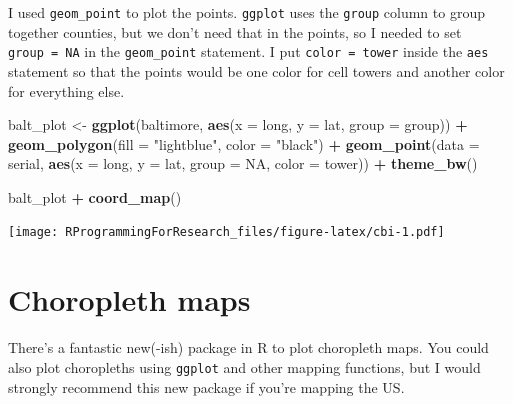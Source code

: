 \documentclass[]{book}
\makeatletter
\newenvironment{Shaded}{\begin{snugshade}}{\end{snugshade}}
\newcommand{\KeywordTok}[1]{\textcolor[rgb]{0.13,0.29,0.53}{\textbf{#1}}}
\newcommand{\DataTypeTok}[1]{\textcolor[rgb]{0.13,0.29,0.53}{#1}}
\newcommand{\StringTok}[1]{\textcolor[rgb]{0.31,0.60,0.02}{#1}}
\newcommand{\OtherTok}[1]{\textcolor[rgb]{0.56,0.35,0.01}{#1}}
\newcommand{\OperatorTok}[1]{\textcolor[rgb]{0.81,0.36,0.00}{\textbf{#1}}}
\newcommand{\NormalTok}[1]{#1}
\newenvironment{kframe}{%
\medskip{}
\setlength{\fboxsep}{.8em}
 \def\at@end@of@kframe{}%
 \ifinner\ifhmode%
  \def\at@end@of@kframe{\end{minipage}}%
  \begin{minipage}{\columnwidth}%
 \fi\fi%
 \def\FrameCommand##1{\hskip\@totalleftmargin \hskip-\fboxsep
 \colorbox{shadecolor}{##1}\hskip-\fboxsep
     \hskip-\linewidth \hskip-\@totalleftmargin \hskip\columnwidth}%
 \MakeFramed {\advance\hsize-\width
   \@totalleftmargin\z@ \linewidth\hsize
   \@setminipage}}%
 {\par\unskip\endMakeFramed%
 \at@end@of@kframe}
\renewenvironment{Shaded}{\begin{kframe}}{\end{kframe}}
\theoremstyle{definition}
\theoremstyle{definition}
\theoremstyle{definition}
\theoremstyle{remark}
\makeatother
\begin{document}
I used \texttt{geom\_point} to plot the points. \texttt{ggplot} uses the
\texttt{group} column to group together counties, but we don't need that
in the points, so I needed to set \texttt{group\ =\ NA} in the
\texttt{geom\_point} statement. I put \texttt{color\ =\ tower} inside
the \texttt{aes} statement so that the points would be one color for
cell towers and another color for everything else.

\begin{Shaded}
\begin{Highlighting}[]
\NormalTok{balt_plot <-}\StringTok{ }\KeywordTok{ggplot}\NormalTok{(baltimore, }
                    \KeywordTok{aes}\NormalTok{(}\DataTypeTok{x =}\NormalTok{ long, }\DataTypeTok{y =}\NormalTok{ lat, }\DataTypeTok{group =}\NormalTok{ group)) }\OperatorTok{+}\StringTok{ }
\StringTok{        }\KeywordTok{geom_polygon}\NormalTok{(}\DataTypeTok{fill =} \StringTok{"lightblue"}\NormalTok{, }\DataTypeTok{color =} \StringTok{"black"}\NormalTok{) }\OperatorTok{+}
\StringTok{        }\KeywordTok{geom_point}\NormalTok{(}\DataTypeTok{data =}\NormalTok{ serial, }\KeywordTok{aes}\NormalTok{(}\DataTypeTok{x =}\NormalTok{ long, }\DataTypeTok{y =}\NormalTok{ lat,}
                                      \DataTypeTok{group =} \OtherTok{NA}\NormalTok{,}
                                      \DataTypeTok{color =}\NormalTok{ tower)) }\OperatorTok{+}\StringTok{ }
\StringTok{        }\KeywordTok{theme_bw}\NormalTok{()}
\end{Highlighting}
\end{Shaded}

\begin{Shaded}
\begin{Highlighting}[]
\NormalTok{balt_plot }\OperatorTok{+}\StringTok{ }
\StringTok{  }\KeywordTok{coord_map}\NormalTok{()}
\end{Highlighting}
\end{Shaded}

\texttt{[image: RProgrammingForResearch\_files/figure-latex/cbi-1.pdf]}

\section{Choropleth maps}\label{choropleth-maps}

There's a fantastic new(-ish) package in R to plot choropleth maps. You
could also plot choropleths using \texttt{ggplot} and other mapping
functions, but I would strongly recommend this new package if you're
mapping the US.
\end{document}
